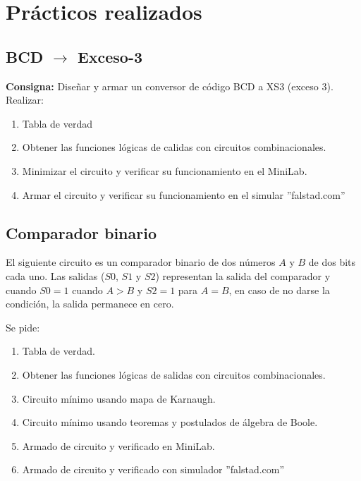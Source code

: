 \section{Prácticos realizados}
\subsection{BCD $\rightarrow$ Exceso-3}
\textbf{Consigna:}
Diseñar y armar un conversor de código BCD a XS3 (exceso 3). Realizar: \begin{enumerate} \item Tabla de verdad \item Obtener las funciones lógicas de calidas con circuitos combinacionales. \item Minimizar el circuito y verificar su funcionamiento en el MiniLab. \item Armar el circuito y verificar su funcionamiento en el simular ''falstad.com'' \end{enumerate}

\subsection{Comparador binario}

El siguiente circuito es un comparador binario de dos números $A$ y $B$ de dos bits cada uno. Las salidas ($S0$, $S1$ y $S2$) representan la salida del comparador y cuando $S0 = 1$ cuando $A>B$ y $S2 = 1$ para $A = B$, en caso de no darse la condición, la salida permanece en cero.

\begin{center}
 \end{center}

Se pide:
\begin{enumerate} \item Tabla de verdad. \item Obtener las funciones lógicas de salidas con circuitos combinacionales. \item Circuito mínimo usando mapa de Karnaugh. \item Circuito mínimo usando teoremas y postulados de álgebra de Boole. \item Armado de circuito y verificado en MiniLab. \item Armado de circuito y verificado con simulador ''falstad.com'' \end{enumerate}

